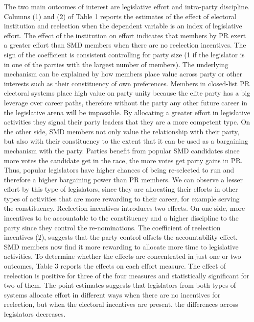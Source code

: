 \documentclass{article}
\begin{document}
The two main outcomes of interest are legislative effort and intra-party discipline. Columns (1) and (2) of Table 1 reports the estimates of the effect of electoral institution and reelection when the dependent variable is an index of legislative effort. The effect of the institution on effort indicates that members by PR exert a greater effort than SMD members when there are no reelection incentives. The sign of the coefficient is consistent controlling for party size (1 if the legislator is in one of the parties with the largest number of members). The underlying mechanism can be explained by how members place value across party or other interests such as their constituency of own preferences. Members in closed-list PR electoral systems place high value on  party unity because the elite party has a big leverage over career paths, therefore without the party any other future career in the legislative arena will be impossible. By allocating a greater effort in legislative activities they signal their party leaders that they are a more competent type. On the other side, SMD members not only value the relationship with their party, but also with their constituency to the extent that it can be used as a bargaining mechanism with the party. Parties benefit from popular SMD candidates since more votes the candidate get in the race, the more votes get party gains in PR. Thus, popular legislators have higher chances of being re-selected to run and therefore a higher bargaining power than PR members. We can observe a lesser effort by this type of legislators, since they are allocating their efforts in other types of activities that are more rewarding to their career, for example serving the constituency. Reelection incentives introduces two effects. On one side, more incentives to be accountable to the constituency and a higher discipline to the party since they control the re-nominations. The coefficient of reelection incentives (2), suggests that the party control offsets the accountability effect. SMD members now find it more rewarding to allocate more time to legislative activities. To determine whether the effects are concentrated in just one or two outcomes, Table 3 reports the effects on each effort measure. The effect of reelection is positive for three of the four measures and statistically significant for two of them. The point estimates suggests that legislators from both types of systems allocate effort in  different ways when there are no incentives for reelection, but when the electoral incentives are present, the differences across legislators decreases. \\
\end{document}
